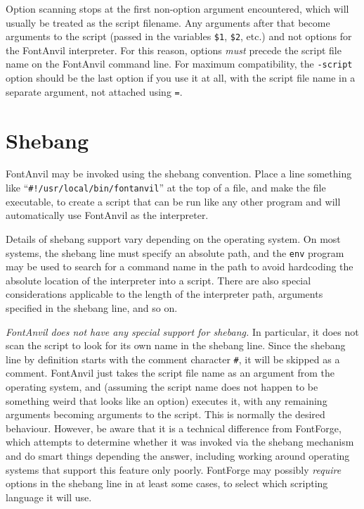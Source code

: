 \documentclass[11pt]{report}
\begin{document}
\begin{framed}
Option scanning stops at the first non-option argument encountered, which
will usually be treated as the script filename.  Any arguments after that
become arguments to the script (passed in the variables \texttt{\$1},
\texttt{\$2}, etc.) and not options for the FontAnvil interpreter.  For this
reason, options \emph{must} precede the script file name on the FontAnvil
command line.  For maximum compatibility, the \texttt{-script} option should
be the last option if you use it at all, with the script file name in a
separate argument, not attached using \texttt{=}.
\end{framed}

\section{Shebang}

FontAnvil may be invoked using the shebang convention.  Place a line
something like ``\texttt{\#!/usr/local/bin/fontanvil}'' at the top of a
file, and make the file executable, to create a script that can be run like
any other program and will automatically use FontAnvil as the interpreter.

Details of shebang support vary depending on the operating system.  On most
systems, the shebang line must specify an absolute path, and the
\texttt{env} program may be used to search for a command name in the path to
avoid hardcoding the absolute location of the interpreter into a script. 
There are also special considerations applicable to the length of the
interpreter path, arguments specified in the shebang line, and so on. 

\emph{FontAnvil does not have any special support for shebang.}  In
particular, it does not scan the script to look for its own name in the
shebang line.  Since the shebang line by definition starts with the comment
character \texttt{\#}, it will be skipped as a comment.  FontAnvil just
takes the script file name as an argument from the operating system, and
(assuming the script name does not happen to be something weird that looks
like an option) executes it, with any remaining arguments becoming arguments
to the script.  This is normally the desired behaviour.  However, be aware
that it is a technical difference from FontForge, which attempts to
determine whether it was invoked via the shebang mechanism and do smart
things depending the answer, including working around operating systems that
support this feature only poorly.  FontForge may possibly \emph{require}
options in the shebang line in at least some cases, to select which
scripting language it will use.
\end{document}
